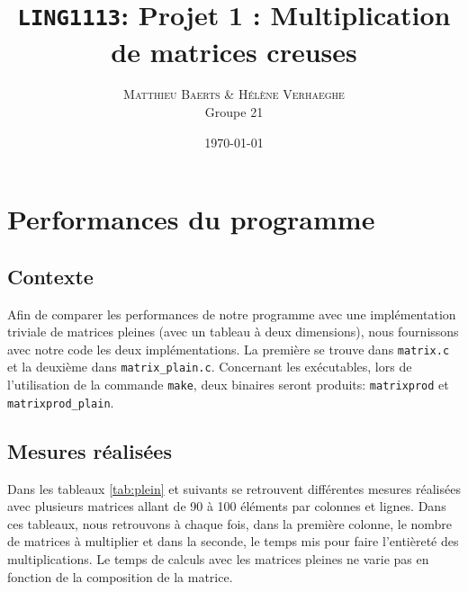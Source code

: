 \documentclass[a4paper]{scrartcl}
\date{\today} %
\title{\texttt{LING1113}: Projet 1 : Multiplication de matrices creuses}
\author{\textsc{Matthieu Baerts} \& \textsc{Hélène Verhaeghe}\\Groupe 21}
\begin{document}
\maketitle
\section{Performances du programme}
\subsection{Contexte}
Afin de comparer les performances de notre programme avec une implémentation triviale de matrices pleines (avec un tableau à deux dimensions), nous fournissons avec notre code les deux implémentations. La première se trouve dans \texttt{matrix.c} et la deuxième dans \texttt{matrix\_plain.c}. Concernant les exécutables, lors de l'utilisation de la commande \texttt{make}, deux binaires seront produits: \texttt{matrixprod} et \texttt{matrixprod\_plain}.

\subsection{Mesures réalisées}
Dans les tableaux \ref{tab:plein} et suivants se retrouvent différentes mesures réalisées avec plusieurs matrices allant de 90 à 100 éléments par colonnes et lignes. Dans ces tableaux, nous retrouvons à chaque fois, dans la première colonne, le nombre de matrices à multiplier et dans la seconde, le temps mis pour faire l'entièreté des multiplications. Le temps de calculs avec les matrices pleines ne varie pas en fonction de la composition de la matrice.\\
\end{document}
